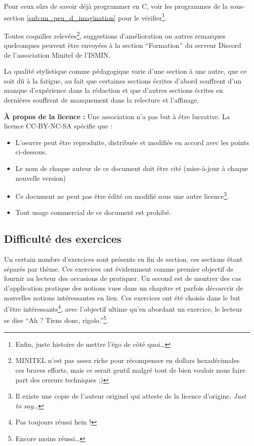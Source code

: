 \documentclass[../main.tex]{subfiles}
\begin{document}
Pour ceux sûrs de savoir déjà programmer en C, voir les programmes de la sous-section \ref{sub:un_peu_d_imagination} pour le vérifier\footnote{Enfin, juste histoire de mettre l'égo de côté quoi\dots}.

\hrulefill

Toutes coquilles relevées\footnote{MINITEL n'est pas assez riche pour récompenser en dollars hexadécimales ces braves efforts, mais ce serait gentil malgré tout de bien vouloir nous faire part des erreurs techniques ;)}, suggestions d'amélioration ou autres remarques quelconques peuvent être envoyées à la section ``Formation'' du serveur Discord de l'association Minitel de l'ISMIN.

La qualité stylistique comme pédagogique varie d'une section à une autre, que ce soit dû à la fatigue, au fait que certaines sections écrites d'abord souffrent d'un manque d'expérience dans la rédaction et que d'autres sections écrites en dernières souffrent de manquement dans la relecture et l'affinage.

\textbf{À propos de la licence :} Une association n'a pas but à être lucrative. La licence \textsc{CC-BY-NC-SA} spécifie que :
\begin{itemize}
	\item L'oeuvre peut être reproduite, distribuée et modifiée en accord avec les points ci-dessous.
	\item Le nom de chaque auteur de ce document doit être cité (mise-à-jour à chaque nouvelle version)
	\item Ce document ne peut pas être édité ou modifié sous une autre licence\footnote{Il existe une copie de l'auteur originel qui atteste de la licence d'origine. \textit{Just to say\dots}}.
	\item Tout usage commercial de ce document est prohibé.
\end{itemize}

\hrulefill

\subsection*{Difficulté des exercices}

Un certain nombre d'exercices sont présents en fin de section, ces sections étant séparés par thème. Ces exercices ont évidemment comme premier objectif de fournir au lecteur des occasions de pratiquer. Un second est de montrer des cas d'application pratique des notions vues dans un chapitre et parfois découvrir de nouvelles notions intéressantes en lien. Ces exercices ont été choisis dans le but d'être intéressants\footnote{Pas toujours réussi hein !}, avec l'objectif ultime qu'en abordant un exercice, le lecteur se dise ``Ah ? Tiens donc, rigolo.''\footnote{Encore moins réussi\dots}.
\end{document}
